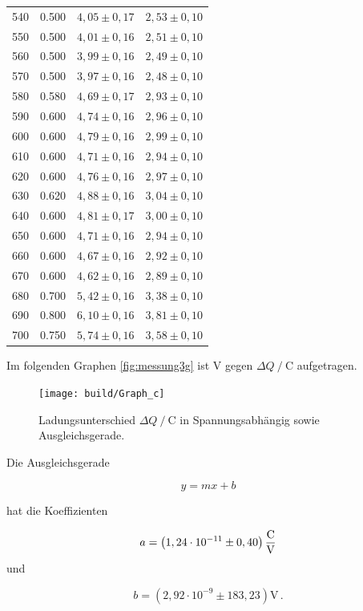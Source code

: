 \begin{table}[H]
\begin{tabular}{S[table-format=3.0] S[table-format=1.3] S  S}
      540  &  0.500 &  {$4,05 \pm 0,17$} &  {$2,53 \pm 0,10$}       \\
      550  &  0.500 &  {$4,01 \pm 0,16$} &  {$2,51 \pm 0,10$}       \\
      560  &  0.500 &  {$3,99 \pm 0,16$} &  {$2,49 \pm 0,10$}       \\
      570  &  0.500 &  {$3,97 \pm 0,16$} &  {$2,48 \pm 0,10$}       \\
      580  &  0.580 &  {$4,69 \pm 0,17$} &  {$2,93 \pm 0,10$}       \\
      590  &  0.600 &  {$4,74 \pm 0,16$} &  {$2,96 \pm 0,10$}       \\
      600  &  0.600 &  {$4,79 \pm 0,16$} &  {$2,99 \pm 0,10$}       \\
      610  &  0.600 &  {$4,71 \pm 0,16$} &  {$2,94 \pm 0,10$}       \\
      620  &  0.600 &  {$4,76 \pm 0,16$} &  {$2,97 \pm 0,10$}       \\
      630  &  0.620 &  {$4,88 \pm 0,16$} &  {$3,04 \pm 0,10$}       \\
      640  &  0.600 &  {$4,81 \pm 0,17$} &  {$3,00 \pm 0,10$}       \\
      650  &  0.600 &  {$4,71 \pm 0,16$} &  {$2,94 \pm 0,10$}       \\
      660  &  0.600 &  {$4,67 \pm 0,16$} &  {$2,92 \pm 0,10$}       \\
      670  &  0.600 &  {$4,62 \pm 0,16$} &  {$2,89 \pm 0,10$}       \\
      680  &  0.700 &  {$5,42 \pm 0,16$} &  {$3,38 \pm 0,10$}       \\
      690  &  0.800 &  {$6,10 \pm 0,16$} &  {$3,81 \pm 0,10$}       \\
      700  &  0.750 &  {$5,74 \pm 0,16$} &  {$3,58 \pm 0,10$}       \\ 
    \bottomrule
    \end{tabular}
\end{table}

Im folgenden Graphen \autoref{fig:messung3g} ist $ \unit{\volt}$ gegen $\Delta Q \mathbin{/} \unit{\coulomb}$ aufgetragen.
\begin{figure}[H]
  \centering
  \texttt{[image: build/Graph\_c]}
  \caption{Ladungsunterschied $\Delta Q \mathbin{/} \unit{\coulomb}$ in Spannungsabhängig sowie Ausgleichsgerade.}
  \label{fig:messung3g}
\end{figure}

Die Ausgleichsgerade 

\begin{equation*}
   y = m x + b
\end{equation*}

hat die Koeffizienten

\begin{equation*}
  a = \left( 1,24 \cdot 10^{-11} \pm 0,40 \right) \unit{\dfrac{\coulomb}{\volt}}
\end{equation*}
und

\begin{equation*}
  b = \left( 2,92 \cdot 10^{-9} \pm 183,23 \right) \unit{\volt \, .}
\end{equation*}
